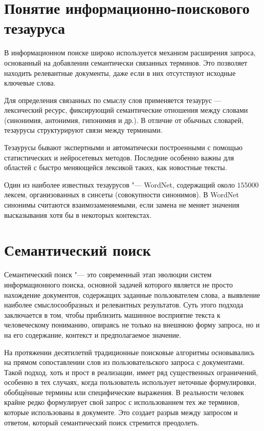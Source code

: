 \documentclass[coursework]{SCWorks}
\begin{document}


\section{Понятие информационно-поискового тезауруса}
В информационном поиске широко используется механизм расширения запроса, основанный на добавлении семантически связанных терминов. Это позволяет находить релевантные документы, даже если в них отсутствуют исходные ключевые слова.

Для определения связанных по смыслу слов применяется тезаурус — лексический ресурс, фиксирующий семантические отношения между словами (синонимия, антонимия, гипонимия и др.). В отличие от обычных словарей, тезаурусы структурируют связи между терминами\cite{thesaurus}.

Тезаурусы бывают экспертными и автоматически построенными с помощью статистических и нейросетевых методов. Последние особенно важны для областей с быстро меняющейся лексикой таких, как новостные тексты.

Один из наиболее известных тезаурусов "--- WordNet, содержащий около $155000$ лексем, организованных в синсеты (совокупности синонимов). В WordNet синонимы считаются взаимозаменяемыми, если замена не меняет значения высказывания хотя бы в некоторых контекстах\cite{miller1995wordnet}.


\section{Семантический поиск}
Семантический поиск "--- это современный этап эволюции систем информационного поиска, основной задачей которого является не просто нахождение документов, содержащих заданные пользователем слова, а выявление наиболее смыслосообразных и релевантных результатов. Суть этого подхода заключается в том, чтобы приблизить машинное восприятие текста к человеческому пониманию, опираясь не только на внешнюю форму запроса, но и на его содержание, контекст и предполагаемое значение.

На протяжении десятилетий традиционные поисковые алгоритмы основывались на прямом сопоставлении слов из пользовательского запроса с документами. Такой подход, хоть и прост в реализации, имеет ряд существенных ограничений, особенно в тех случаях, когда пользователь использует неточные формулировки, обобщённые термины или специфические выражения. В реальности человек крайне редко формулирует свой запрос с использованием тех же терминов, которые использованы в документе. Это создает разрыв между запросом и ответом, который семантический поиск стремится преодолеть.
\end{document}

